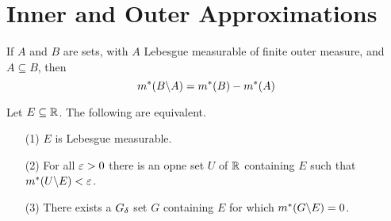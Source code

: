 \section{Inner and Outer Approximations}

\begin{lemma}[Excision]\label{2.3.1}
    If $A$ and  $B$ are sets, with  $A$ Lebesgue measurable of finite outer
    measure, and  $A \subseteq B$, then
    \begin{equation*}
        m^\ast(B\backslash A)=m^\ast(B)-m^\ast(A)
    \end{equation*}
\end{lemma}

\begin{theorem}\label{2.3.2}
    Let $E \subseteq \mathbb{R}$. The following are equivalent.
    \begin{enumerate}
        \item[(1)] $E$ is Lebesgue measurable.

        \item[(2)] For all $\varepsilon>0$ there is an opne set  $U$ of  $\mathbb{R}$ containing
             $E$ such that  $m^\ast(U\backslash E)<\varepsilon$.

         \item[(3)] There exists a $G_\delta$ set  $G$ containing  $E$ for which
             $m^\ast(G\backslash E)=0$.
    \end{enumerate}
\end{theorem}
